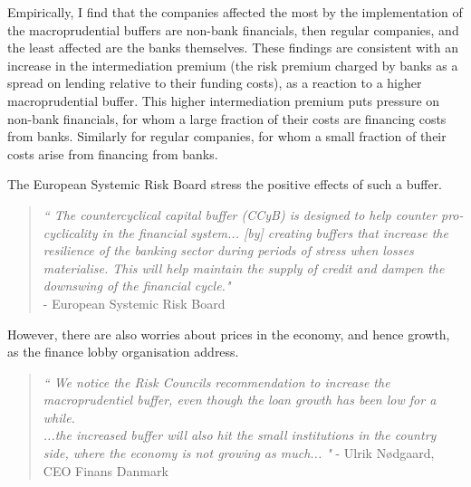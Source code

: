 \documentclass[11pt]{article}
\begin{document}
Empirically, I find that the companies affected the most by the implementation of the macroprudential buffers are non-bank financials, then regular companies, and the least affected are the banks themselves. These findings are consistent with an increase in the intermediation premium (the risk premium charged by banks as a spread on lending relative to their funding costs), as a reaction to a higher macroprudential buffer. This higher intermediation premium puts pressure on non-bank financials, for whom a large fraction of their costs are financing costs from banks. Similarly for regular companies, for whom a small fraction of their costs arise from financing from banks.

The European Systemic Risk Board stress the positive effects of such a buffer.

\begin{quote}\textit{``
The countercyclical capital buffer (CCyB) is designed to help counter pro-cyclicality in the financial system... [by] creating buffers that increase the resilience of the banking sector during periods of stress when losses materialise. This will help maintain the supply of credit and dampen the downswing of the financial cycle."}\\
\hspace{1em}- {European Systemic Risk Board}
\end{quote}

However, there are also worries about prices in the economy, and hence growth, as the finance lobby organisation address.

\begin{quote}\textit{``
We notice the Risk Councils recommendation to increase the macroprudentiel buffer, even though the loan growth has been low for a while.\\ ...the increased buffer will also hit the small institutions in the country side, where the economy is not growing as much...
"}
- {Ulrik Nødgaard, CEO Finans Danmark}
\end{quote}
\end{document}
